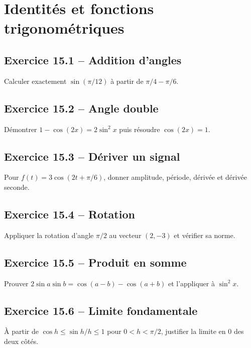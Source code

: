 \chapter{Identités et fonctions trigonométriques}
\section*{Exercice 15.1 -- Addition d'angles}
Calculer exactement $\sin(\pi/12)$ à partir de $\pi/4-\pi/6$.

\section*{Exercice 15.2 -- Angle double}
Démontrer $1-\cos(2x)=2\sin^2x$ puis résoudre $\cos(2x)=1$.

\section*{Exercice 15.3 -- Dériver un signal}
Pour $f(t)=3\cos(2t+\pi/6)$, donner amplitude, période, dérivée et dérivée seconde.

\section*{Exercice 15.4 -- Rotation}
Appliquer la rotation d'angle $\pi/2$ au vecteur $(2,-3)$ et vérifier sa norme.

\section*{Exercice 15.5 -- Produit en somme}
Prouver $2\sin a\sin b=\cos(a-b)-\cos(a+b)$ et l'appliquer à $\sin^2x$.

\section*{Exercice 15.6 -- Limite fondamentale}
À partir de $\cos h\le\sin h/h\le1$ pour $0<h<\pi/2$, justifier la limite en $0$ des deux côtés.
